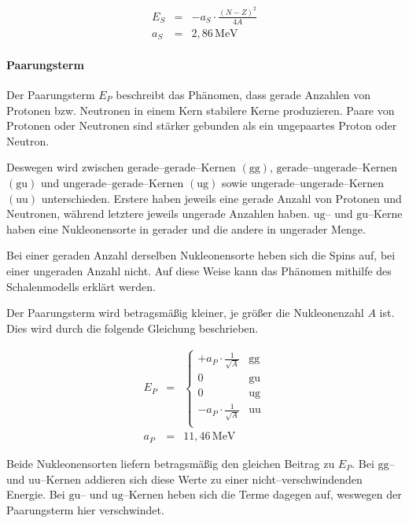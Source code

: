 \documentclass[12pt,a4paper]{scrartcl}
\numberwithin{equation}{section} %
\begin{document}
\begin{eqnarray}
	E_S &=& - a_S\cdot \frac{(N-Z)^2}{4A} \label{Symmetrieterm} \\
	a_S &=& 2,86\mathrm{\,MeV}
\end{eqnarray}

\hypertarget{paarungsterm}{%
	\paragraph{Paarungsterm}\label{paarungsterm}}

Der Paarungsterm $E_P$ beschreibt das Phänomen, dass gerade Anzahlen von Protonen bzw. Neutronen in einem Kern stabilere Kerne produzieren. Paare von Protonen oder Neutronen sind stärker gebunden als ein ungepaartes Proton oder Neutron.

Deswegen wird zwischen $\mathrm{gerade}$--$\mathrm{gerade}$--Kernen $(\mathrm{gg})$, $\mathrm{gerade}$--$\mathrm{ungerade}$--Kernen $(\mathrm{gu})$ und $\mathrm{ungerade}$--$\mathrm{gerade}$--Kernen $(\mathrm{ug})$ sowie $\mathrm{ungerade}$--$\mathrm{ungerade}$--Kernen $(\mathrm{uu})$ unterschieden. Erstere haben jeweils eine gerade Anzahl von Protonen und Neutronen, während letztere jeweils ungerade Anzahlen haben. $\mathrm{ug}$-- und $\mathrm{gu}$--Kerne haben eine Nukleonensorte in gerader und die andere in ungerader Menge.

Bei einer geraden Anzahl derselben Nukleonensorte heben sich die Spins auf, bei einer ungeraden Anzahl nicht. Auf diese Weise kann das Phänomen mithilfe des Schalenmodells erklärt werden.

Der Paarungsterm wird betragsmäßig kleiner, je größer die Nukleonenzahl $A$ ist. Dies wird durch die folgende Gleichung beschrieben.

\begin{eqnarray}
	E_P &=&
	\begin{cases}
		+ a_P\cdot \frac{1}{\sqrt{A}} & \text{gg} \\
		0 & \text{gu} \\
		0 & \text{ug} \\
		- a_P\cdot \frac{1}{\sqrt{A}} & \text{uu} \\
	\end{cases}
	\label{Paarungsterm} \\
	a_P &=& 11,46\mathrm{\,MeV}
\end{eqnarray}

\noindent
Beide Nukleonensorten liefern betragsmäßig den gleichen Beitrag zu $E_P$. Bei $\mathrm{gg}$-- und $\mathrm{uu}$--Kernen addieren sich diese Werte zu einer nicht--verschwindenden Energie. Bei $\mathrm{gu}$-- und $\mathrm{ug}$--Kernen heben sich die Terme dagegen auf, weswegen der Paarungsterm hier verschwindet.
\end{document}
